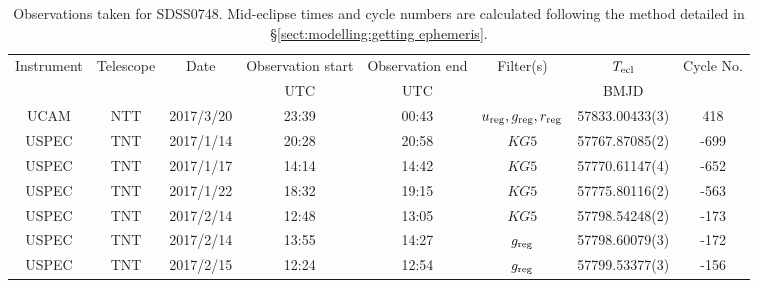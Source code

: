 \begin{table}
	\begin{center}
		\caption{Observations taken for SDSS0748. Mid-eclipse times and cycle numbers are calculated following the method detailed in \S\ref{sect:modelling:getting ephemeris}.}
		\label{table:observing:observation logs SDSS0748}
		\begin{tabular}{cccccccc}
			\hline
			Instrument & Telescope & Date & Observation start & Observation end & Filter(s) & $T_{\rm ecl}$ & Cycle No. \\
			 &  &  & UTC & UTC &  & BMJD &  \\
			\hline
			\hline
			UCAM  & NTT     & 2017/3/20  & 23:39 & 00:43 & $u_{\rm reg},g_{\rm reg},r_{\rm reg}$ & 57833.00433(3)                                                                                                            &                                         418 \\
			USPEC & TNT     & 2017/1/14  & 20:28 & 20:58 & $KG5$                                 & 57767.87085(2)                                                                                                            &                                        -699 \\
			USPEC & TNT     & 2017/1/17  & 14:14 & 14:42 & $KG5$                                 & 57770.61147(4)                                                                                                            &                                        -652 \\
			USPEC & TNT     & 2017/1/22  & 18:32 & 19:15 & $KG5$                                 & 57775.80116(2)                                                                                                            &                                        -563 \\
			USPEC & TNT     & 2017/2/14  & 12:48 & 13:05 & $KG5$                                 & 57798.54248(2)                                                                                                            &                                        -173 \\
			USPEC & TNT     & 2017/2/14  & 13:55 & 14:27 & $g_{\rm reg}$                         & 57798.60079(3)                                                                                                            &                                        -172 \\
			USPEC & TNT     & 2017/2/15  & 12:24 & 12:54 & $g_{\rm reg}$                         & 57799.53377(3)                                                                                                            &                                        -156 \\

\end{tabular}
\end{center}
\end{table}

